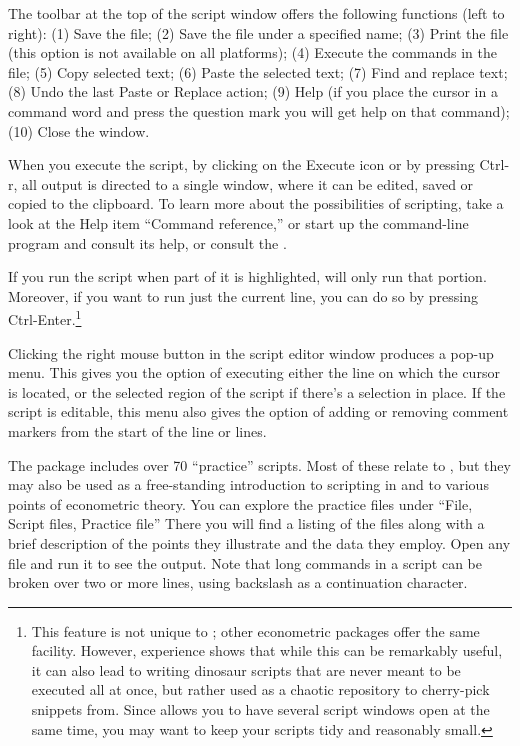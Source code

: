 The toolbar at the top of the script window offers the following
functions (left to right): (1) Save the file; (2) Save the file under
a specified name; (3) Print the file (this option is not available on
all platforms); (4) Execute the commands in the file; (5) Copy
selected text; (6) Paste the selected text; (7) Find and replace text;
(8) Undo the last Paste or Replace action; (9) Help (if you place the
cursor in a command word and press the question mark you will get help
on that command); (10) Close the window.

When you execute the script, by clicking on the Execute icon or by
pressing Ctrl-r, all output is directed to a single window, where it
can be edited, saved or copied to the clipboard.  To learn more about
the possibilities of scripting, take a look at the  Help
item ``Command reference,'' or start up the command-line program
 and consult its help, or consult the \GCR.

If you run the script when part of it is highlighted,  will
only run that portion. Moreover, if you want to run just the current
line, you can do so by pressing Ctrl-Enter.\footnote{This feature is
  not unique to ; other econometric packages offer the same
  facility. However, experience shows that while this can be
  remarkably useful, it can also lead to writing dinosaur scripts that
  are never meant to be executed all at once, but rather used as a
  chaotic repository to cherry-pick snippets from. Since 
  allows you to have several script windows open at the same time, you
  may want to keep your scripts tidy and reasonably small.}

Clicking the right mouse button in the script editor window produces a
pop-up menu.  This gives you the option of executing either the line
on which the cursor is located, or the selected region of the script
if there's a selection in place.  If the script is editable, this menu
also gives the option of adding or removing comment markers from the
start of the line or lines.

The  package includes over 70 ``practice'' scripts.  Most
of these relate to \cite{ramanathan02}, but they may also be used as a
free-standing introduction to scripting in  and to various
points of econometric theory.  You can explore the practice files
under ``File, Script files, Practice file'' There you will find a
listing of the files along with a brief description of the points they
illustrate and the data they employ.  Open any file and run it to see
the output.  Note that long commands in a script can be broken over
two or more lines, using backslash as a continuation character.

